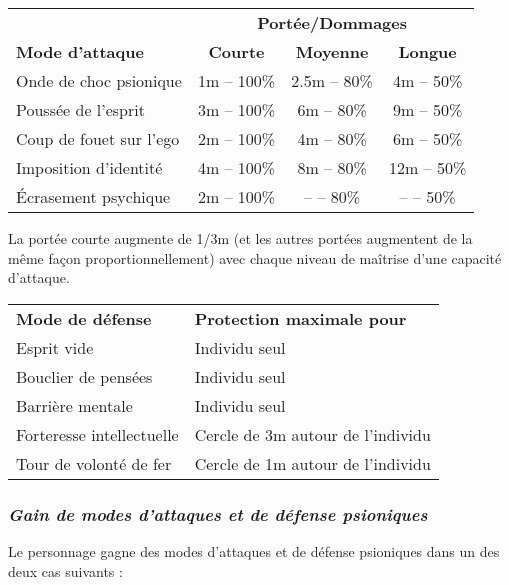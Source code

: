 \bigskip

\begin{tabular}{lccc}
&\multicolumn{3}{c}{\textbf{Portée/Dommages}} \\
\textbf{Mode d'attaque} & \textbf{Courte} & \textbf{Moyenne} & \textbf{Longue} \\
Onde de choc psionique  & 1m -- 100\% & 2.5m -- 80\% &  4m -- 50\% \\
Poussée de l'esprit     & 3m -- 100\% &   6m -- 80\% &  9m -- 50\% \\
Coup de fouet sur l'ego & 2m -- 100\% &   4m -- 80\% &  6m -- 50\% \\
Imposition d'identité   & 4m -- 100\% &   8m -- 80\% & 12m -- 50\% \\
Écrasement psychique    & 2m -- 100\% &   -- -- 80\% & --  -- 50\% \\
\end{tabular}

\bigskip

La portée courte augmente de 1/3m (et les autres portées augmentent de la même façon proportionnellement) avec chaque niveau de maîtrise d'une capacité d'attaque.

\bigskip

\begin{tabular}{p{7.5cm}p{6cm}}
\textbf{Mode de défense} & \textbf{Protection maximale pour} \\
Esprit vide & Individu seul \\
Bouclier de pensées & Individu seul \\
Barrière mentale & Individu seul \\
Forteresse intellectuelle & Cercle de 3m autour de l'individu \\
Tour de volonté de fer & Cercle de 1m autour de l'individu \\
\end{tabular}

\bigskip

\subsubsection*{\textit{Gain de modes d'attaques et de défense psioniques}}

Le personnage gagne des modes d'attaques et de défense psioniques dans un des deux cas suivants :

\bigskip

